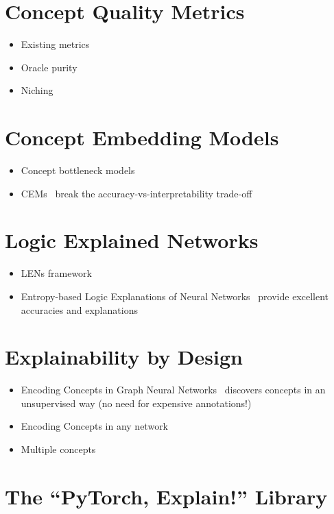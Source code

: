\documentclass[withindex,glossary,secondyr]{cam-thesis}
\begin{document}
\section{Concept Quality Metrics}
\begin{itemize}
    \item Existing metrics~\citep{yeh2020completeness}
    \item Oracle purity~\citep{zarlenga2021quality}
    \item Niching~\citep{zarlenga2021quality}
\end{itemize}


\section{Concept Embedding Models}
\begin{itemize}
    \item Concept bottleneck models~\citep{koh2020concept}
    \item CEMs~\citep{zarlenga2022concept} break the accuracy-vs-interpretability trade-off
\end{itemize}


\section{Logic Explained Networks}
\begin{itemize}
    \item LENs framework~\citep{ciravegna2021logic}
    \item Entropy-based Logic Explanations of Neural Networks~\citep{barbiero2021entropy} provide excellent accuracies and explanations
\end{itemize}


\section{Explainability by Design}
\begin{itemize}
    \item Encoding Concepts in Graph Neural Networks~\citep{magister2022encoding} discovers concepts in an unsupervised way (no need for expensive annotations!)
    \item Encoding Concepts in any network
    \item Multiple concepts
\end{itemize}


\section{The ``PyTorch, Explain!'' Library}
\end{document}
